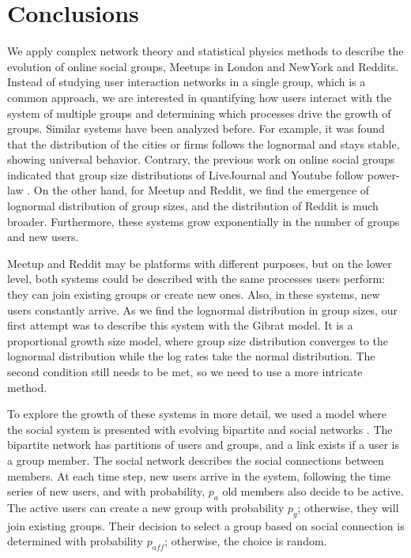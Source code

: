 \newpage
\section{Conclusions}

We apply complex network theory and statistical physics methods to describe the evolution of online social groups, Meetups in London and NewYork and Reddits. Instead of studying user interaction networks in a single group, which is a common approach, we are interested in quantifying how users interact with the system of multiple groups and determining which processes drive the growth of groups. Similar systems have been analyzed before. For example, it was found that the distribution of the cities or firms follows the lognormal and stays stable, showing universal behavior. Contrary, the previous work on online social groups indicated that group size distributions of LiveJournal and Youtube follow power-law \cite{zheleva2009co}. On the other hand, for Meetup and Reddit, we find the emergence of lognormal distribution of group sizes, and the distribution of Reddit is much broader. Furthermore, these systems grow exponentially in the number of groups and new users. 

Meetup and Reddit may be platforms with different purposes, but on the lower level, both systems could be described with the same processes users perform: they can join existing groups or create new ones. Also, in these systems, new users constantly arrive. As we find the lognormal distribution in group sizes, our first attempt was to describe this system with the Gibrat model. It is a proportional growth size model, where group size distribution converges to the lognormal distribution while the log rates take the normal distribution. The second condition still needs to be met, so we need to use a more intricate method.

To explore the growth of these systems in more detail, we used a model where the social system is presented with evolving bipartite and social networks \cite{zheleva2009co}. The bipartite network has partitions of users and groups, and a link exists if a user is a group member. The social network describes the social connections between members. At each time step, new users arrive in the system, following the time series of new users, and with probability, $p_a$ old members also decide to be active. The active users can create a new group with probability $p_g$; otherwise, they will join existing groups. Their decision to select a group based on social connection is determined with probability $p_{aff}$; otherwise, the choice is random. %

